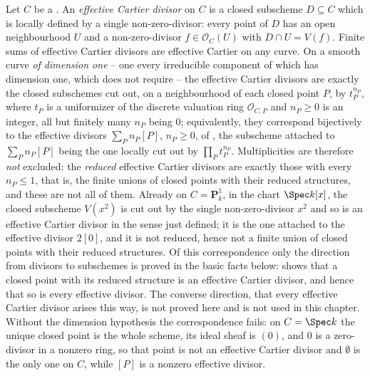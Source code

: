 \begin{definition}
\label{def:pcb-effective-cartier-divisor}
Let \(C\) be a .  An
\emph{effective Cartier divisor} on \(C\) is a closed subscheme
\(D\subseteq C\) which is locally defined by a single
non-zero-divisor: every point of \(D\) has an open neighbourhood
\(U\) and a non-zero-divisor \(f\in\mathcal O_C(U)\) with
\(D\cap U=V(f)\).  Finite sums of effective Cartier divisors are
effective Cartier on any curve.  On a smooth curve \emph{of dimension
one} -- one every irreducible component of which has dimension one,
which  does not require -- the effective Cartier
divisors are exactly the closed subschemes cut out, on a neighbourhood
of each closed point \(P\), by \(t_P^{n_P}\), where \(t_P\) is a
uniformizer of the discrete valuation ring \(\mathcal O_{C,P}\) and
\(n_P\geq0\) is an integer, all but finitely many \(n_P\) being \(0\);
equivalently, they correspond bijectively to the effective divisors
\(\sum_Pn_P[P]\), \(n_P\geq0\), of , the
subscheme attached to \(\sum_Pn_P[P]\) being the one locally cut out
by \(\prod_Pt_P^{n_P}\).  Multiplicities are therefore \emph{not}
excluded: the \emph{reduced} effective Cartier divisors are exactly
those with every \(n_P\leq1\), that is, the finite unions of closed
points with their reduced structures, and these are not all of them.
Already on \(C=\mathbf P^1_k\), in the chart \(\Spec k[x]\), the
closed subscheme \(V(x^2)\) is cut out by the single non-zero-divisor
\(x^2\) and so is an effective Cartier divisor in the sense just
defined; it is the one attached to the effective divisor \(2[0]\), and
it is not reduced, hence not a finite union of closed points with
their reduced structures.  Of this correspondence only the direction
from divisors to subschemes is proved in the basic facts below:
 shows that a closed point with its
reduced structure is an effective Cartier divisor, and hence that so
is every effective divisor.  The converse direction, that every
effective Cartier divisor arises this way, is not proved here and is
not used in this chapter.  Without the dimension hypothesis the
correspondence fails: on \(C=\Spec k\) the unique closed point is the
whole scheme, its ideal sheaf is \((0)\), and \(0\) is a zero-divisor
in a nonzero ring, so that point is not an effective Cartier divisor
and \(\emptyset\) is the only one on \(C\), while \([P]\) is a nonzero
effective divisor.
\end{definition}

